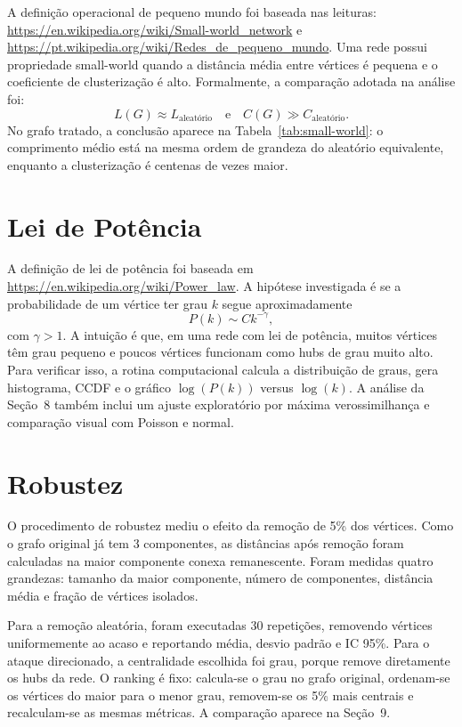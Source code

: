 \documentclass[sigconf]{webmedia}
\begin{document}
A definição operacional de pequeno mundo foi baseada nas leituras:
\url{https://en.wikipedia.org/wiki/Small-world_network} e
\url{https://pt.wikipedia.org/wiki/Redes_de_pequeno_mundo}. Uma rede
possui propriedade small-world quando a distância média entre vértices é
pequena e o coeficiente de clusterização é alto. Formalmente, a
comparação adotada na análise foi:
\[
  L(G) \approx L_{\text{aleatório}}
  \quad\text{e}\quad
  C(G) \gg C_{\text{aleatório}}.
\]
No grafo tratado, a conclusão aparece na Tabela~\ref{tab:small-world}: o
comprimento médio está na mesma ordem de grandeza do aleatório
equivalente, enquanto a clusterização é centenas de vezes maior.

\section{Lei de Potência}

A definição de lei de potência foi baseada em
\url{https://en.wikipedia.org/wiki/Power_law}. A hipótese investigada é
se a probabilidade de um vértice ter grau $k$ segue aproximadamente
\[
  P(k) \sim Ck^{-\gamma},
\]
com $\gamma > 1$. A intuição é que, em uma rede com lei de potência,
muitos vértices têm grau pequeno e poucos vértices funcionam como hubs
de grau muito alto. Para verificar isso, a rotina computacional calcula a
distribuição de graus, gera histograma, CCDF e o gráfico
$\log(P(k))$ versus $\log(k)$. A análise da Seção~8 também inclui um
ajuste exploratório por máxima verossimilhança e comparação visual com
Poisson e normal.

\section{Robustez}

O procedimento de robustez mediu o efeito da remoção de 5\% dos
vértices. Como o grafo original já tem 3 componentes, as
distâncias após remoção foram calculadas na maior componente conexa
remanescente. Foram medidas quatro grandezas: tamanho da maior
componente, número de componentes, distância média e fração de vértices
isolados.

Para a remoção aleatória, foram executadas 30 repetições, removendo
vértices uniformemente ao acaso e reportando média, desvio padrão e IC
95\%. Para o ataque direcionado, a centralidade escolhida foi grau,
porque remove diretamente os hubs da rede. O ranking é fixo: calcula-se
o grau no grafo original,
ordenam-se os vértices do maior para o menor grau, removem-se os 5\%
mais centrais e recalculam-se as mesmas métricas. A comparação aparece
na Seção~9.
\end{document}
